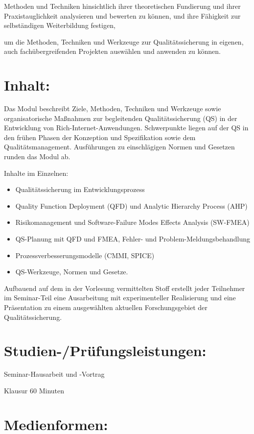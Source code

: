 Methoden und Techniken hinsichtlich ihrer theoretischen Fundierung und
ihrer Praxistauglichkeit analysieren und bewerten zu können, und ihre
Fähigkeit zur selbständigen Weiterbildung festigen,

um die Methoden, Techniken und Werkzeuge zur Qualitätssicherung in
eigenen, auch fachübergreifenden Projekten auswählen und anwenden zu
können.

\section*{Inhalt:}\label{inhalt-27}

Das Modul beschreibt Ziele, Methoden, Techniken und Werkzeuge sowie
organisatorische Maßnahmen zur begleitenden Qualitätssicherung (QS) in
der Entwicklung von Rich-Internet-Anwendungen. Schwerpunkte liegen auf
der QS in den frühen Phasen der Konzeption und Spezifikation sowie dem
Qualitätsmanagement. Ausführungen zu einschlägigen Normen und Gesetzen
runden das Modul ab.

Inhalte im Einzelnen:

\begin{itemize}
\item
  Qualitätssicherung im Entwicklungsprozess
\item
  Quality Function Deployment (QFD) und Analytic Hierarchy Process (AHP)
\item
  Risikomanagement und Software-Failure Modes Effects Analysis (SW-FMEA)
\item
  QS-Planung mit QFD und FMEA, Fehler- und Problem-Meldungsbehandlung
\item
  Prozessverbesserungsmodelle (CMMI, SPICE)
\item
  QS-Werkzeuge, Normen und Gesetze.
\end{itemize}

Aufbauend auf dem in der Vorlesung vermittelten Stoff erstellt jeder
Teilnehmer im Seminar-Teil eine Ausarbeitung mit experimenteller
Realisierung und eine Präsentation zu einem ausgewählten aktuellen
Forschungsgebiet der Qualitätssicherung.

\section*{Studien-/Prüfungsleistungen:}\label{studien-pruxfcfungsleistungen-27}

Seminar-Hausarbeit und -Vortrag

Klausur 60 Minuten

\section*{Medienformen:}\label{medienformen-27}

